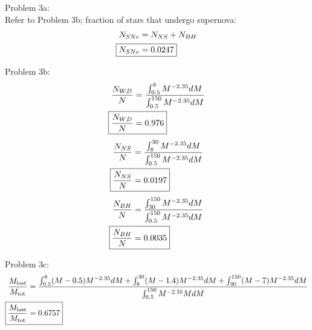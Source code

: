 \documentclass[10pt,letter,preprint]{aastex}
\begin{document}
Problem 3a:\\
Refer to Problem 3b; fraction of stars that undergo supernova:
\begin{align}
N_{SNe} &= N_{NS} + N_{BH}\\
\Aboxed{N_{SNe} &= 0.0247}
\end{align}


Problem 3b:\\
\begin{align}
\frac{N_{WD}}{N} &= \frac{\int_{0.5}^{8} M^{-2.35}dM}{ {\int_{0.5}^{150} M^{-2.35}dM}}\\
\Aboxed{\frac{N_{WD}}{N} &= 0.976}
\end{align}
\begin{align}
\frac{N_{NS}}{N} &= \frac{\int_{8}^{30} M^{-2.35}dM}{ {\int_{0.5}^{150} M^{-2.35}dM}}\\
\Aboxed{\frac{N_{NS}}{N} &= 0.0197}
\end{align}
\begin{align}
\frac{N_{BH}}{N} &= \frac{\int_{30}^{150} M^{-2.35}dM}{ {\int_{0.5}^{150} M^{-2.35}dM}}\\
\Aboxed{\frac{N_{BH}}{N} &= 0.0035}
\end{align}

Problem 3c:\\
\begin{align}
\frac{M_{\textrm{lost}}}{M_{\textrm{tot}}} &= \frac{\int_{0.5}^8 (M-0.5)M^{-2.35}dM + \int_{8}^{30} (M-1.4) M^{-2.35}dM  + \int_{30}^{150} (M-7) M^{-2.35}dM  }{\int_{0.5}^{150} M^{-2.35}M dM}\\
\Aboxed{\frac{M_{\textrm{lost}}}{M_{\textrm{tot}}} &= 0.6757}
\end{align}
\end{document}
